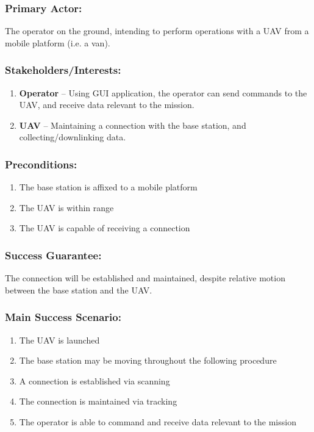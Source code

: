 \documentclass[ProductRequirements.tex]{subfiles}
\begin{document}
	\subsubsection*{Primary Actor:}
	The operator on the ground, intending to perform operations with a UAV from a mobile platform (i.e. a van).
	\subsubsection*{Stakeholders/Interests:}
	\begin{enumerate}\itemsep1pt
		\item \textbf{Operator} -- Using GUI application, the operator can send commands to the UAV, and receive data relevant to the mission. 
		\item \textbf{UAV} -- Maintaining a connection with the base station, and collecting/downlinking data. 
	\end{enumerate}
	\subsubsection*{Preconditions:}
	\begin{enumerate}\itemsep1pt
		\item The base station is affixed to a mobile platform
		\item The UAV is within range
		\item The UAV is capable of receiving a connection
	\end{enumerate}
	\subsubsection*{Success Guarantee:}
	The connection will be established and maintained, despite relative motion between the base station and the UAV.
	\subsubsection*{Main Success Scenario:}
	\begin{enumerate}\itemsep1pt
		\item The UAV is launched
		\item The base station may be moving throughout the following procedure
		\item A connection is established via scanning
		\item The connection is maintained via tracking
		\item The operator is able to command and receive data relevant to the mission 
	\end{enumerate}
\end{document}

